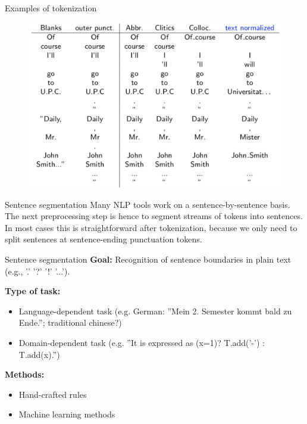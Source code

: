 \begin{frame}[containsverbatim]{Examples of tokenization}
    \begin{figure}
        \centering
        \includegraphics[width=\linewidth]{img/token.png}
    \end{figure}
\end{frame}

\begin{frame}[containsverbatim]{Sentence segmentation}
    Many NLP tools work on a sentence-by-sentence basis. The next preprocessing step is hence to segment streams of tokens into sentences. In most cases this is straightforward after tokenization, because we only need to split sentences at sentence-ending punctuation tokens.
\end{frame}

\begin{frame}[containsverbatim]{Sentence segmentation}
    \textbf{Goal:} Recognition of sentence boundaries in plain text (e.g., ’.’ ’?’ ’!’ ’...’).
    
    \textbf{Type of task:}
    \begin{itemize}
        \item Language-dependent task (e.g. German: ”Mein 2. Semester kommt bald zu Ende.”; traditional chinese?)
        \item Domain-dependent task \newline
        (e.g. ”It is expressed as (x=1)? T.add(’-’) : T.add(x).”)
    \end{itemize}
    
    \textbf{Methods:}
    \begin{itemize}
        \item Hand-crafted rules
        \item Machine learning methods
    \end{itemize}
\end{frame}

